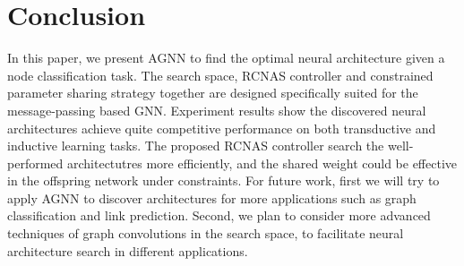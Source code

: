 \documentclass[sigconf]{acmart}
\begin{document}
\section{Conclusion}
In this paper, we present AGNN to find the optimal neural architecture given a node classification task. The search space, RCNAS controller and constrained parameter sharing strategy together are designed specifically suited for the message-passing based GNN. Experiment results show the discovered neural architectures achieve quite competitive performance on both transductive and inductive learning tasks.
The proposed RCNAS controller search the well-performed architectutres more efficiently, and the shared weight could be effective in the offspring network under constraints. For future work, first we will try to apply AGNN to discover architectures for more applications such as graph classification and link prediction. Second, we plan to consider more advanced techniques of graph convolutions in the search space, to facilitate neural architecture search in different applications. 

\balance


\end{document}
